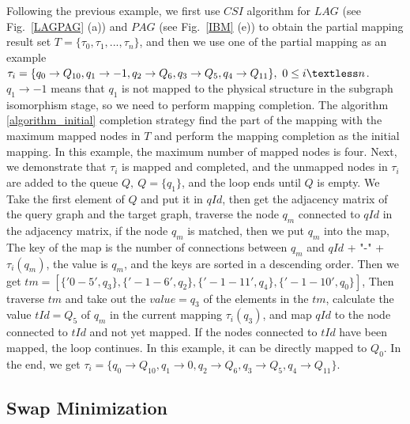 \documentclass[runningheads]{llncs}
\begin{document}
	\begin{example}
		Following the previous example, 
we first use  $CSI$ algorithm for $LAG$
(see Fig.~\ref{LAGPAG} (a)) and $PAG$ (see Fig.~\ref{IBM} (e)) 
to obtain the partial mapping result set $T=\{\tau_{0},\tau_{1},...,\tau_{n}\}$, 
and then we use one of the partial mapping as an example
$\tau_{i}=\{q_{0}\rightarrow Q_{10},q_{1}\rightarrow -1,
	q_{2}\rightarrow Q_{6},q_{3}\rightarrow Q_{5},q_{4}\rightarrow Q_{11}\}, \ 0 \le i \textless n$. 
	$q_{1}\rightarrow -1$ means that $q_{1}$ is not mapped to the physical structure in the subgraph isomorphism stage,
	so we need to perform mapping completion. 
	The algorithm \ref{algorithm_initial} completion strategy  find the part of the mapping with
	the maximum mapped nodes in $T$ and perform the mapping completion as the initial mapping.
	In this example, the maximum number of mapped nodes is four. 
	Next, we demonstrate that $\tau_{i}$ is mapped and completed, 
	and the unmapped nodes in $\tau_{i}$ are added to the queue $Q, \ Q=\{q_{1}\}$, 
	and the loop ends until $Q$ is empty. 
	We Take the first element of $Q$ and put it in $qId$, 
	then get the adjacency matrix of the query graph and the target graph, 
	traverse the node $q_{m}$ connected to $qId$ in the adjacency matrix, 
	if the node $q_{m}$ is matched, then we put $q_{m}$ into the map, 
	The key of the map is the number of connections between $q_{m}$ and $qId$ + "-" + $\tau_{i}(q_{m})$,
	 the value is $q_{m}$, and the keys are sorted in a descending order. 
	 Then we get $tm=[\{'0-5',q_{3}\},\{'-1-6',q_{2}\},\{'-1-11',q_{4}\},\{'-1-10',q_{0}\}]$, 
	 Then traverse $tm$ and take out the $value=q_{3}$ of the elements in the $tm$, 
	 calculate the value $tId=Q_{5}$ of $q_{m}$ in the current mapping $\tau_{i}(q_{3})$, 
	 and map $qId$ to the node connected to $tId$ and not yet mapped. 
	 If the nodes connected to $tId$ have been mapped, 
	 the loop continues. In this example, it can be directly mapped to $Q_{0}$. In the end, we get 
	 $ \tau_{i}=\{q_{0}\rightarrow  Q_{10},q_{1}\rightarrow  0,
	q_{2}\rightarrow  Q_{6},q_{3}\rightarrow  Q_{5},q_{4}\rightarrow  Q_{11}\}$.
	\end{example}
\subsection{Swap Minimization}
\end{document}
